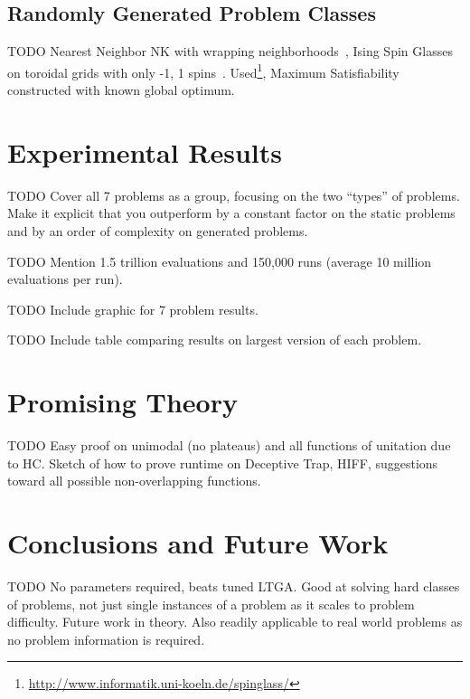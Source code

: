 \documentclass{sig-alternate}
\begin{document}
\subsection{Randomly Generated Problem Classes}
TODO Nearest Neighbor NK with wrapping neighborhoods~\cite{wright:2000:solvingnk}, Ising Spin Glasses on toroidal
grids with only -1, 1 spins~\cite{saul:1994:spinglass}.
Used\footnote{\url{http://www.informatik.uni-koeln.de/spinglass/}}, Maximum Satisfiability constructed with known global
optimum.

\section{Experimental Results}
TODO Cover all 7 problems as a group, focusing on the two ``types'' of problems.
Make it explicit that you outperform by a constant factor on the static problems
and by an order of complexity on generated problems.

TODO Mention 1.5 trillion evaluations and 150,000 runs (average 10 million evaluations per run).

TODO Include graphic for 7 problem results.

TODO Include table comparing results on largest version of each problem.

\section{Promising Theory}
TODO Easy proof on unimodal (no plateaus) and all functions of unitation due to HC.
Sketch of how to prove runtime on Deceptive Trap, HIFF, suggestions toward all
possible non-overlapping functions.

\section{Conclusions and Future Work}
TODO No parameters required, beats tuned LTGA.  Good at solving hard classes
of problems, not just single instances of a problem as it scales to problem difficulty.
Future work in theory.  Also readily applicable to real world problems as no
problem information is required.

%

%
%
\balancecolumns
\end{document}
